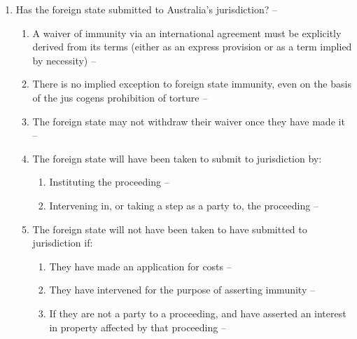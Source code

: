 \begin{enumerate}
\begin{enumerate}
\begin{enumerate}
        \end{enumerate}
        \item Has the foreign state submitted to Australia's jurisdiction? -- 
        \begin{enumerate}
            \item A waiver of immunity via an international agreement must be explicitly derived from its terms (either as an express provision or as a term implied by necessity) -- 
            \item There is no implied exception to foreign state immunity, even on the basis of the jus cogens prohibition of torture -- 
            \item The foreign state may not withdraw their waiver once they have made it -- 
            \item The foreign state will have been taken to submit to jurisdiction by:
            \begin{enumerate}
                \item Instituting the proceeding -- 
                \item Intervening in, or taking a step as a party to, the proceeding -- 
            \end{enumerate}
            \item The foreign state will not have been taken to have submitted to jurisdiction if:
            \begin{enumerate}
                \item They have made an application for costs -- 
                \item They have intervened for the purpose of asserting immunity -- 
                \item If they are not a party to a proceeding, and have asserted an interest in property affected by that proceeding -- 
            \end{enumerate}
        \end{enumerate}

\end{enumerate}
\end{enumerate}
